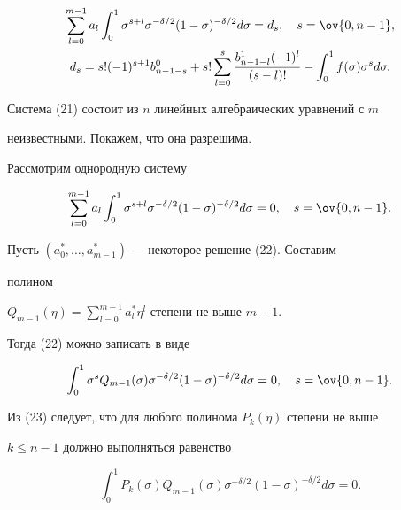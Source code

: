 \begin{gather} 


\sum^{m-1}_{l=0}a_l\int^1_0 \sigma^{s+l}\sigma^{-\delta/2} 


(1-\sigma)^{-\delta/2}d\sigma=d_s,\quad s=\ov{0,n-1}, \\ 


% 


d_s=s!(-1)^{s+1}b^0_{n-1-s}+s!\sum^s_{l=0} 


\frac{b^1_{n-1-l}(-1)^l}{(s-l)!}-\int^1_0 


f(\sigma)\sigma^s d\sigma.\notag 


\end{gather} 


Система (21) состоит из $n$ линейных алгебраических уравнений с $m$ 


неизвестными. Покажем, что она разрешима. 


 


Рассмотрим однородную систему 


\begin{equation} 


\sum^{m-1}_{l=0}a_l\int^1_0 \sigma^{s+l}


\sigma^{-\delta/2}(1-\sigma)^{-\delta/2}d\sigma=0, 


\quad s=\ov{0,n-1}. 


\end{equation} 


Пусть $(a^*_0,\dotsc,a^*_{m-1})$ --- некоторое решение (22). Составим 


полином 


$Q_{m-1}(\eta)=\sum\limits^{m-1}_{l=0}a^*_l\eta^l$ степени не выше $m-1$. 


Тогда (22) можно записать в виде 


\begin{equation} 


\int^1_0 \sigma^s Q_{m-1}(\sigma)\sigma^{-\delta/2} 


(1-\sigma)^{-\delta/2}d\sigma=0,\quad s=\ov{0,n-1}. 


\end{equation} 


Из (23) следует, что для любого полинома $P_k(\eta)$ степени не выше 


$k\le n-1$ должно выполняться равенство 


\begin{equation} 


\int^1_0 P_k(\sigma)Q_{m-1}(\sigma)\sigma^{-\delta/2} 


(1-\sigma)^{-\delta/2}d\sigma=0. 


\end{equation} 


